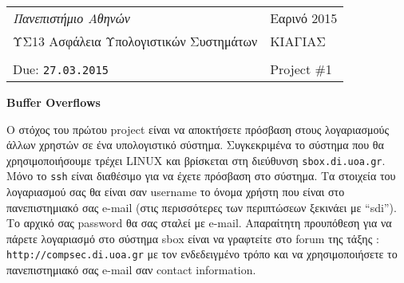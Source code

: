 \documentclass[11pt,a4paper]{article}
\begin{document}
\begin{tabular}{|p{10cm}p{4cm}|}
\hline
{\em Πανεπιστήμιο Αθηνών} & \hfill Εαρινό 2015 \\
ΥΣ13 Ασφάλεια Υπολογιστικών Συστημάτων & \hfill ΚΙΑΓΙΑΣ \\
& \\
Due: {\tt 27.03.2015} &  \hfill  Project \#1 \\
\hline
\end{tabular}
\vspace{0.5cm}


{\bf Buffer Overflows}

\medskip

Ο στόχος του πρώτου project είναι να αποκτήσετε 
πρόσβαση στους λογαριασμούς άλλων χρηστών σε ένα υπολογιστικό
σύστημα. Συγκεκριμένα το σύστημα που θα χρησιμοποιήσουμε
τρέχει LINUX και βρίσκεται στη διεύθυνση 
{\tt sbox.di.uoa.gr}. Μόνο το  {\tt ssh} είναι διαθέσιμο
για να έχετε πρόσβαση στο σύστημα. Τα στοιχεία του λογαριασμού
σας θα είναι σαν username το όνομα χρήστη που είναι στο πανεπιστημιακό
σας e-mail (στις περισσότερες των περιπτώσεων ξεκινάει με ``sdi'').
Το αρχικό σας password θα σας σταλεί με e-mail. Απαραίτητη προυπόθεση για να πάρετε λογαριασμό στο σύστημα sbox είναι να γραφτείτε στο forum 
της τάξης : {\tt http://compsec.di.uoa.gr} με τον ενδεδειγμένο τρόπο
και να χρησιμοποιήσετε το πανεπιστημιακό σας e-mail σαν contact information. 
\end{document}
